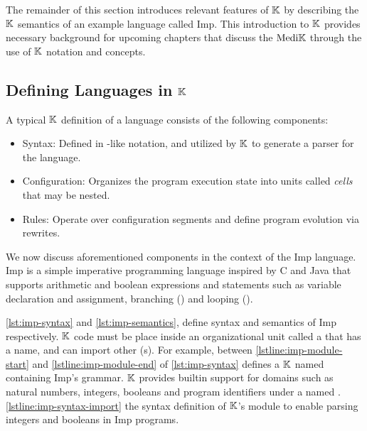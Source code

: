 The remainder of this section introduces relevant features of
$\mathbb{K}{}$ by describing the $\mathbb{K}{}$ semantics of an example language called
Imp. This introduction to $\mathbb{K}{}$ provides necessary background
for upcoming chapters that discuss the $\text{Medi}\mathbb{K}{}{}$ \DSL{} through the
use of $\mathbb{K}{}$ notation and concepts.

\subsection{Defining Languages in $\mathbb{K}$}\label{sec:semantics-in-k}

A typical $\mathbb{K}$ definition of a language consists of the following components:
\begin{itemize}
  \item Syntax: Defined in \BNF{}-like notation, and utilized by $\mathbb{K}$
    to generate a parser for the language.
  \item Configuration: Organizes the program execution state
    into units called \emph{cells} that may be nested.
  \item Rules: Operate over configuration segments and define program
    evolution via rewrites.
\end{itemize}
We now discuss aforementioned components in the context of the Imp
language. Imp is a simple imperative programming language
inspired by C and Java that supports arithmetic and boolean expressions and
statements such as variable declaration and assignment, branching ()
and looping ().

\autoref{lst:imp-syntax} and \autoref{lst:imp-semantics},
define syntax and semantics of Imp respectively.
$\mathbb{K}{}$ code must be place inside an organizational unit called a
 that has a name, and can import other (s).
For example, 
between \autoref{lstline:imp-module-start} and
\autoref{lstline:imp-module-end} of \autoref{lst:imp-syntax} defines
a $\mathbb{K}{}$  named  containing Imp's
grammar. $\mathbb{K}{}$ provides builtin support for domains such as natural
numbers, integers, booleans and program identifiers
under a  named .
\autoref{lstline:imp-syntax-import} 
the syntax definition of $\mathbb{K}{}$'s  module
to enable parsing integers and booleans in Imp programs.


